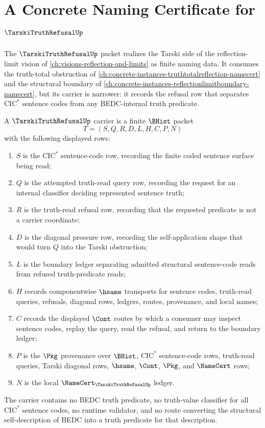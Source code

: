 \chapter{A Concrete Naming Certificate for $\TarskiTruthRefusalUp$}
\label{ch:concrete-instances-tarski-truth-refusal-namecert}

The $\TarskiTruthRefusalUp$ packet realizes the Tarski side of the reflection-limit vision of \autoref{ch:visions-reflection-and-limits} as finite naming data. It consumes the truth-total obstruction of \autoref{ch:concrete-instances-truthtotalreflection-namecert} and the structural boundary of \autoref{ch:concrete-instances-reflectionlimitboundary-namecert}, but its carrier is narrower: it records the refusal row that separates $\mathrm{CIC}^{*}$ sentence codes from any BEDC-internal truth predicate.

\begin{definition}
\label{def:tarski-truth-refusal-carrier}
A $\TarskiTruthRefusalUp$ carrier is a finite $\BHist$ packet
$$
T=(S,Q,R,D,L,H,C,P,N)
$$
with the following displayed rows:
\begin{enumerate}
\item $S$ is the $\mathrm{CIC}^{*}$ sentence-code row, recording the finite coded sentence surface being read;
\item $Q$ is the attempted truth-read query row, recording the request for an internal classifier deciding represented sentence truth;
\item $R$ is the truth-read refusal row, recording that the requested predicate is not a carrier coordinate;
\item $D$ is the diagonal pressure row, recording the self-application shape that would turn $Q$ into the Tarski obstruction;
\item $L$ is the boundary ledger separating admitted structural sentence-code reads from refused truth-predicate reads;
\item $H$ records componentwise $\hsame$ transports for sentence codes, truth-read queries, refusals, diagonal rows, ledgers, routes, provenance, and local names;
\item $C$ records the displayed $\Cont$ routes by which a consumer may inspect sentence codes, replay the query, read the refusal, and return to the boundary ledger;
\item $P$ is the $\Pkg$ provenance over $\BHist$, $\mathrm{CIC}^{*}$ sentence-code rows, truth-read queries, Tarski diagonal rows, $\hsame$, $\Cont$, $\Pkg$, and $\NameCert$ rows;
\item $N$ is the local $\NameCert_{\TarskiTruthRefusalUp}$ ledger.
\end{enumerate}
The carrier contains no BEDC truth predicate, no truth-value classifier for all $\mathrm{CIC}^{*}$ sentence codes, no runtime validator, and no route converting the structural self-description of BEDC into a truth predicate for that description.
\end{definition}


